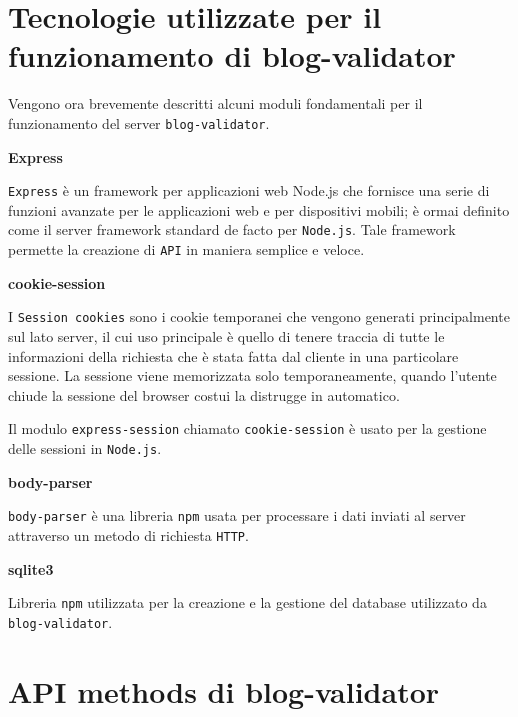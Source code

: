 \medskip

\bigskip

\section{Tecnologie utilizzate per il funzionamento di blog-validator}

\medskip

Vengono ora brevemente descritti alcuni moduli fondamentali per il funzionamento del server {\tt blog-validator}.

\clearpage

\textbf{Express}

\bigskip

{\tt Express} è un framework per applicazioni web Node.js che fornisce una serie di funzioni avanzate per le applicazioni web e per dispositivi mobili; è ormai definito come il server framework standard de facto per {\tt Node.js}. Tale framework permette la creazione di {\tt API} in maniera semplice e veloce.

\bigskip

\textbf{cookie-session}

\bigskip

I {\tt Session cookies} sono i cookie temporanei che vengono generati principalmente sul lato server, il cui uso principale è quello di tenere traccia di tutte le informazioni della richiesta che è stata fatta dal cliente in una particolare sessione. La sessione viene memorizzata solo temporaneamente, quando l'utente chiude la sessione del browser costui la distrugge in automatico. 

\medskip

Il modulo {\tt express-session} chiamato {\tt cookie-session} è usato per la gestione delle sessioni in {\tt Node.js}.

\bigskip

\textbf{body-parser}

\bigskip

{\tt body-parser} è una libreria {\tt npm} usata per processare i dati inviati al server attraverso un metodo di richiesta {\tt HTTP}.

\bigskip

\textbf{sqlite3}

\bigskip

Libreria {\tt npm} utilizzata per la creazione e la gestione del database utilizzato da {\tt blog-validator}.

\bigskip

\section{API methods di blog-validator}

